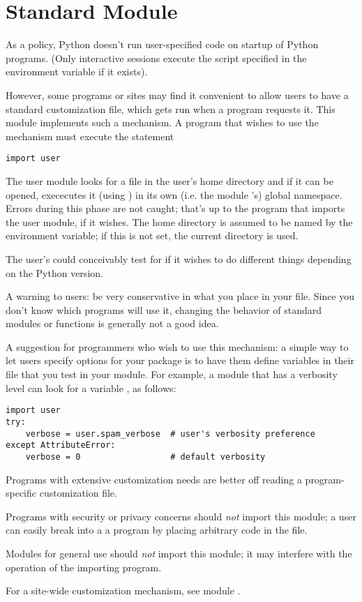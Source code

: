 \section{Standard Module }
\label{module-user}

As a policy, Python doesn't run user-specified code on startup of
Python programs.  (Only interactive sessions execute the script
specified in the  environment variable if it exists).

However, some programs or sites may find it convenient to allow users
to have a standard customization file, which gets run when a program
requests it.  This module implements such a mechanism.  A program
that wishes to use the mechanism must execute the statement

\bcode\begin{verbatim}
import user
\end{verbatim}\ecode

The user module looks for a file  in the user's
home directory and if it can be opened, exececutes it (using
) in its own (i.e. the module 's) global
namespace.  Errors during this phase are not caught; that's up to the
program that imports the user module, if it wishes.  The home
directory is assumed to be named by the  environment
variable; if this is not set, the current directory is used.

The user's  could conceivably test for
 if it wishes to do different things depending on
the Python version.

A warning to users: be very conservative in what you place in your
 file.  Since you don't know which programs will
use it, changing the behavior of standard modules or functions is
generally not a good idea.

A suggestion for programmers who wish to use this mechanism: a simple
way to let users specify options for your package is to have them
define variables in their  file that you test in
your module.  For example, a module  that has a verbosity
level can look for a variable , as follows:

\bcode\begin{verbatim}
import user
try:
    verbose = user.spam_verbose  # user's verbosity preference
except AttributeError:
    verbose = 0                  # default verbosity
\end{verbatim}\ecode

Programs with extensive customization needs are better off reading a
program-specific customization file.

Programs with security or privacy concerns should \emph{not} import
this module; a user can easily break into a a program by placing
arbitrary code in the  file.

Modules for general use should \emph{not} import this module; it may
interfere with the operation of the importing program.

For a site-wide customization mechanism, see module .
